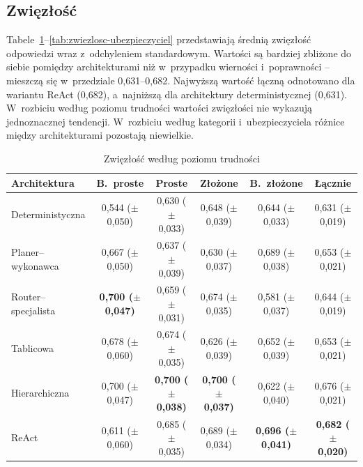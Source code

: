   \subsection{Zwięzłość}\label{subsec:wyniki-zwiezlosc}

  Tabele~\ref{tab:zwiezlosc-trudnosc}--\ref{tab:zwiezlosc-ubezpieczyciel}
  przedstawiają średnią zwięzłość odpowiedzi wraz z~odchyleniem standardowym.
  Wartości są bardziej zbliżone do siebie pomiędzy architekturami niż w~przypadku
  wierności i~poprawności -- mieszczą się w~przedziale 0{,}631--0{,}682.
  Najwyższą wartość łączną odnotowano dla wariantu ReAct (0{,}682), a~najniższą
  dla architektury deterministycznej (0{,}631). W~rozbiciu według poziomu
  trudności wartości zwięzłości nie wykazują jednoznacznej tendencji. W~rozbiciu
  według kategorii i~ubezpieczyciela różnice między architekturami pozostają
  niewielkie.

  \begin{table}[H]
    \caption{Zwięzłość według poziomu trudności}\label{tab:zwiezlosc-trudnosc}
    \centering
    \footnotesize
    \renewcommand{\arraystretch}{1.3}
    \begin{tabular}{@{} l c c c c c @{}}
      \toprule
      \textbf{Architektura}
      & \textbf{B.~proste}
      & \textbf{Proste}
      & \textbf{Złożone}
      & \textbf{B.~złożone}
      & \textbf{Łącznie}                                                                                                                                                                  \\
      \midrule
      Deterministyczna    & 0{,}544 (\(\pm\) 0{,}050)          & 0{,}630 (\(\pm\) 0{,}033)          & 0{,}648 (\(\pm\) 0{,}039)          & 0{,}644 (\(\pm\) 0{,}033)          & 0{,}631 (\(\pm\) 0{,}019)          \\
      Planer--wykonawca   & 0{,}667 (\(\pm\) 0{,}050)          & 0{,}637 (\(\pm\) 0{,}039)          & 0{,}630 (\(\pm\) 0{,}037)          & 0{,}689 (\(\pm\) 0{,}038)          & 0{,}653 (\(\pm\) 0{,}021)          \\
      Router--specjalista & \textbf{0{,}700 (\(\pm\) 0{,}047)} & 0{,}659 (\(\pm\) 0{,}031)          & 0{,}674 (\(\pm\) 0{,}035)          & 0{,}581 (\(\pm\) 0{,}037)          & 0{,}644 (\(\pm\) 0{,}019)          \\
      Tablicowa           & 0{,}678 (\(\pm\) 0{,}060)          & 0{,}674 (\(\pm\) 0{,}035)          & 0{,}626 (\(\pm\) 0{,}039)          & 0{,}652 (\(\pm\) 0{,}039)          & 0{,}653 (\(\pm\) 0{,}021)          \\
      Hierarchiczna       & 0{,}700 (\(\pm\) 0{,}047)          & \textbf{0{,}700 (\(\pm\) 0{,}038)} & \textbf{0{,}700 (\(\pm\) 0{,}037)} & 0{,}622 (\(\pm\) 0{,}040)          & 0{,}676 (\(\pm\) 0{,}021)          \\
      ReAct               & 0{,}611 (\(\pm\) 0{,}060)          & 0{,}685 (\(\pm\) 0{,}035)          & 0{,}689 (\(\pm\) 0{,}034)          & \textbf{0{,}696 (\(\pm\) 0{,}041)} & \textbf{0{,}682 (\(\pm\) 0{,}020)} \\
      \bottomrule
    \end{tabular}
  \end{table}

